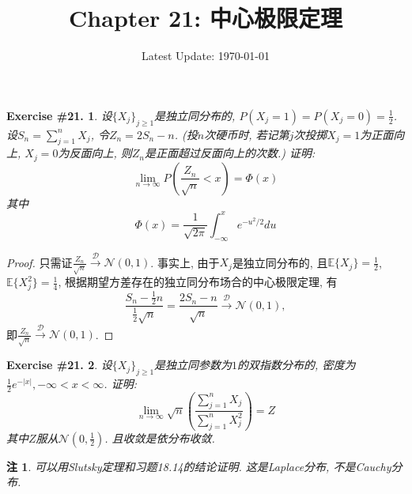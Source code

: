 \documentclass[UTF8, a4paper]{article}
\title{Chapter 21: 中心极限定理}
\author{}
\date{Latest Update: \today}
\newtheorem{exercise}{Exercise \#21.}
\newtheorem*{remark}{注}
\begin{document}
\maketitle

\begin{framed}
\begin{exercise}
设\(\{X_j\}_{j\geq 1}\)是独立同分布的, \(P(X_j = 1) = P(X_j =  0) = \frac{1}{2}\).
设\(S_n = \sum_{j=1}^{n}X_j\), 令\(Z_n = 2S_n - n\). (投\(n\)次硬币时, 若记第\(j\)次投掷\(X_j = 1\)为正面向上, \(X_j = 0\)为反面向上, 则\(Z_n\)是正面超过反面向上的次数.)
证明: 
$$
\lim _{n \rightarrow \infty} P\left(\frac{Z_n}{\sqrt{n}}<x\right)=\Phi(x)
$$
其中 
$$
\Phi(x)=\frac{1}{\sqrt{2 \pi}} \int_{-\infty}^x e^{-u^2 / 2} d u
$$
\end{exercise}
\end{framed}

\begin{proof}
只需证\(\frac{Z_n}{\sqrt{n}} \xrightarrow{\mathcal{D}} \mathcal{N}(0, 1)\).
事实上, 由于\(X_j\)是独立同分布的, 且\(\mathbb{E}\{X_j\} = \frac{1}{2}\), \(\mathbb{E}\{X_j^2\} = \frac{1}{4}\), 根据期望方差存在的独立同分布场合的中心极限定理, 有
$$
\frac{S_n - \frac{1}{2}n}{\frac{1}{2}\sqrt{n}} = \frac{2S_n - n}{\sqrt{n}} \xrightarrow{\mathcal{D}} \mathcal{N}(0, 1), 
$$
即\(\frac{Z_n}{\sqrt{n}} \xrightarrow{\mathcal{D}} \mathcal{N}(0, 1)\).
\end{proof}


\begin{framed}
\begin{exercise}
设\(\{X_j\}_{j\geq 1}\)是独立同参数为\(1\)的双指数分布的, 密度为\(\frac{1}{2}e^{-|x|}, -\infty < x < \infty\).
证明: 
$$
\lim _{n \rightarrow \infty} \sqrt{n}\left(\frac{\sum_{j=1}^n X_j}{\sum_{j=1}^n X_j^2}\right)=Z
$$
其中\(Z\)服从\(\mathcal{N}\left(0, \frac{1}{2}\right)\).
且收敛是依分布收敛.
\end{exercise}
\end{framed}

\begin{remark}
可以用Slutsky定理和习题18.14的结论证明. 这是Laplace分布, 不是Cauchy分布.
\end{remark}
\end{document}
